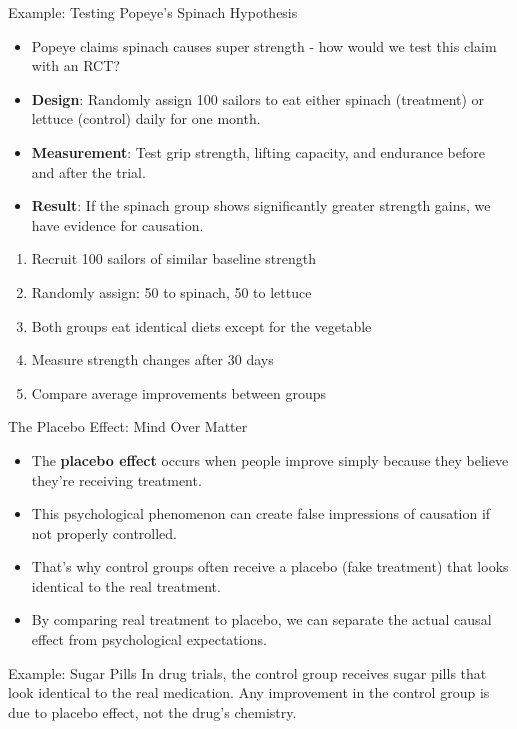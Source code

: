 \documentclass{beamer}
\begin{document}
	\begin{frame}{Example: Testing Popeye's Spinach Hypothesis}
		\begin{itemize}
			\item Popeye claims spinach causes super strength - how would we test this claim with an RCT?
			\item \textbf{Design}: Randomly assign 100 sailors to eat either spinach (treatment) or lettuce (control) daily for one month.
			\item \textbf{Measurement}: Test grip strength, lifting capacity, and endurance before and after the trial.
			\item \textbf{Result}: If the spinach group shows significantly greater strength gains, we have evidence for causation.
		\end{itemize}
		
		\begin{example}[RCT Design for Popeye]
			\small
			\begin{enumerate}
				\item Recruit 100 sailors of similar baseline strength
				\item Randomly assign: 50 to spinach, 50 to lettuce
				\item Both groups eat identical diets except for the vegetable
				\item Measure strength changes after 30 days
				\item Compare average improvements between groups
			\end{enumerate}
		\end{example}
	\end{frame}
	
	\begin{frame}{The Placebo Effect: Mind Over Matter}
		\begin{itemize}
			\item The \textbf{placebo effect} occurs when people improve simply because they believe they're receiving treatment.
			\item This psychological phenomenon can create false impressions of causation if not properly controlled.
			\item That's why control groups often receive a placebo (fake treatment) that looks identical to the real treatment.
			\item By comparing real treatment to placebo, we can separate the actual causal effect from psychological expectations.
		\end{itemize}
		
		\begin{block}{Example: Sugar Pills}
			In drug trials, the control group receives sugar pills that look identical to the real medication. Any improvement in the control group is due to placebo effect, not the drug's chemistry.
		\end{block}
	\end{frame}
	
\end{document}
